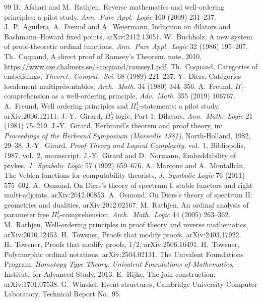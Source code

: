 \documentclass[11pt]{article}
\theoremstyle{definition}
\theoremstyle{remark}
\begin{document}
\begin{thebibliography}{99}
 B.~Afshari and M.~Rathjen, Reverse mathematics and
  well-ordering principles: a pilot study, \emph{Ann.\ Pure Appl.\ Logic}
  160 (2009) 231--237.
 J.~P.~Aguilera, A.~Freund and A.~Weiermann, Induction on
  dilators and Bachmann--Howard fixed points, arXiv:2412.13051.
 W.~Buchholz, A new system of proof-theoretic ordinal
  functions, \emph{Ann.\ Pure Appl.\ Logic} 32 (1986) 195--207.
 Th.~Coquand, A direct proof of Ramsey's Theorem, note,
  2010, \url{https://www.cse.chalmers.se/~coquand/ramsey1.pdf}.
 Th.~Coquand, Categories of embeddings, \emph{Theoret.\
  Comput.\ Sci.} 68 (1989) 221--237.
 Y.~Diers, Cat\'egories localement multipr\'esentables,
  \emph{Arch.\ Math.} 34 (1980) 344--356.
 A.~Freund, $\Pi^1_1$-comprehension as a well-ordering
  principle, \emph{Adv.\ Math.} 355 (2019) 106767.
 A.~Freund, Well ordering principles and
  $\Pi^1_4$-statements: a pilot study, arXiv:2006.12111.
 J.-Y.~Girard, $\Pi^1_2$-logic, Part 1: Dilators,
  \emph{Ann.\ Math.\ Logic} 21 (1981) 75--219.
 J.-Y.~Girard, Herbrand's theorem and proof theory, in:
  \emph{Proceedings of the Herbrand Symposium (Marseille 1981)},
  North-Holland, 1982, 29--38.
 J.-Y.~Girard, \emph{Proof Theory and Logical
  Complexity}, vol.~1, Bibliopolis, 1987; vol.~2, manuscript.
 J.-Y.~Girard and D.~Normann, Embeddability of ptykes,
  \emph{J.\ Symbolic Logic} 57 (1992) 659--676.
 A.~Marcone and A.~Montalb\'an, The Veblen functions for
  computability theorists, \emph{J.\ Symbolic Logic} 76 (2011) 575--602.
\bibitem{Osm1} A.~Osmond, On Diers's theory of spectrum I: stable functors
  and right multi-adjoints, arXiv:2012.00853.
 A.~Osmond, On Diers's theory of spectrum II: geometries and
  dualities, arXiv:2012.02167.
 M.~Rathjen, An ordinal analysis of parameter free
  $\Pi^1_2$-comprehension, \emph{Arch.\ Math.\ Logic} 44 (2005) 263--362.
\bibitem{Rat21} M.~Rathjen, Well-ordering principles in proof theory and
  reverse mathematics, arXiv:2010.12453.
 H.~Towsner, Proofs that modify proofs, arXiv:2403.17922.
\bibitem{TowHalf} H.~Towsner, Proofs that modify proofs, 1/2,
  arXiv:2506.16491.
 H.~Towsner, Polymorphic ordinal notations,
  arXiv:2504.02131.
 The Univalent Foundations Program, \emph{Homotopy Type
  Theory: Univalent Foundations of Mathematics}, Institute for Advanced
  Study, 2013.
 E.~Rijke, The join construction, arXiv:1701.07538.
\bibitem{Win} G.~Winskel, Event structures, Cambridge University Computer
  Laboratory, Technical Report No.~95.
\end{thebibliography}
\end{document}
